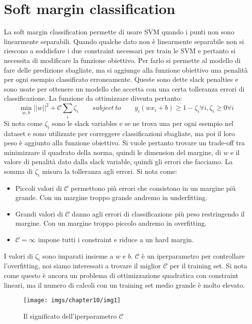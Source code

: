 \section{Soft margin classification}
La soft margin classification permette di usare SVM quando i punti non sono linearmente separabili.
Quando qualche dato non \`e linearmente separabile non si riescono a soddisfare i due constraint necessari per train le SVM e pertanto si necessita di modificare la funzione obiettivo.
Per farlo si permette al modello di fare delle predizione sbagliate, ma si aggiunge alla funzione obiettivo una penalit\`a per ogni esempio classificato erroneamente.
Queste sono dette slack penalties e sono usate per ottenere un modello che accetta con una certa tolleranza errori di classificazione.
La funzione da ottimizzare diventa pertanto:
$$\min_{w,b}||w||^2+\mathcal{C}\sum_i\zeta_i\qquad subject\ to\qquad y_i(wx_i+b)\ge 1 -\zeta_i\forall i, \zeta_i \ge 0 \forall i$$
Si nota come $\zeta_i$ sono le slack variables e se ne trova una per ogni esempio nel dataset e sono utilizzate per correggere classificazioni sbagliate, ma poi il loro peso \`e aggiunto alla funzione obiettivo.
Si vuole pertanto trovare un trade-off tra minimizzare il quadrato della norma, quindi le dimension del margine, di $w$ e il valore di penalit\`a dato dalla slack variable, quindi gli errori che facciamo.
La somma di $\zeta_i$ misura la tolleranza agli errori.
Si nota come:
\begin{multicols}{2}
	\begin{itemize}
		\item Piccoli valori di $\mathcal{C}$ permettono pi\`u errori che consistono in un margine pi\`u grande. 
		Con un margine troppo grande andremo in underfitting.
		\item Grandi valori di $\mathcal{C}$ danno agli errori di classificazione pi\`u peso restringendo il margine. 
		Con un margine troppo piccolo andremo in overfitting.
		\item $\mathcal{C} = \infty$ impone tutti i constraint e riduce a un hard margin.
	\end{itemize}
\end{multicols}
I valori di $\zeta_i$ sono imparati insieme a $w$ e $b$.
$\mathcal{C}$ \`e un iperparametro per controllare l'overfitting, noi siamo interessati a trovare il miglior $\mathcal{C}$ per il training set.
Si nota come questo \`e ancora un problema di ottimizzazione quadratica con constraint lineari, ma il numero di calcoli con un training set medio grande \`e molto elevato.
\begin{figure}
	\centering
	\texttt{[image: imgs/chapter10/img1]}
	\caption{Il significato dell'iperparametro $\mathcal{C}$}
	\label{fig:chapter10-01}
\end{figure}

